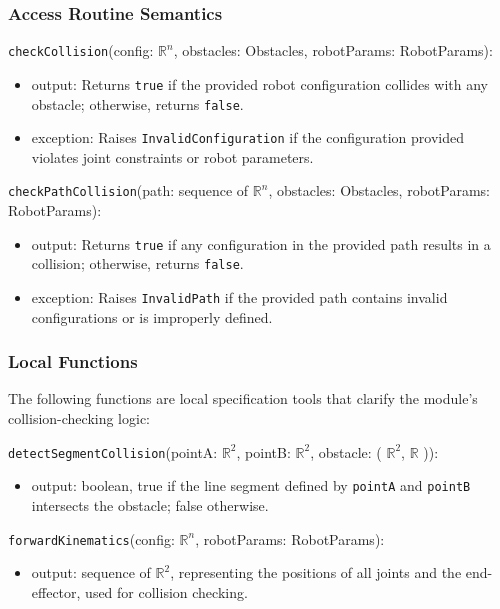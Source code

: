 \documentclass[12pt, titlepage]{article}
\begin{document}
\subsubsection{Access Routine Semantics}

\noindent \texttt{checkCollision}(config: $\mathbb{R}^n$, obstacles: Obstacles, robotParams: RobotParams):
\begin{itemize}
\item output: Returns \texttt{true} if the provided robot configuration collides with any obstacle; otherwise, returns \texttt{false}.
\item exception: Raises \texttt{InvalidConfiguration} if the configuration provided violates joint constraints or robot parameters.
\end{itemize}

\noindent \texttt{checkPathCollision}(path: sequence of $\mathbb{R}^n$, obstacles: Obstacles, robotParams: RobotParams):
\begin{itemize}
\item output: Returns \texttt{true} if any configuration in the provided path results in a collision; otherwise, returns \texttt{false}.
\item exception: Raises \texttt{InvalidPath} if the provided path contains invalid configurations or is improperly defined.
\end{itemize}

\subsubsection{Local Functions}

The following functions are local specification tools that clarify the module's collision-checking logic:

\noindent \texttt{detectSegmentCollision}(pointA: $\mathbb{R}^2$, pointB: $\mathbb{R}^2$, obstacle: ( $\mathbb{R}^2$, $\mathbb{R}$ )):
\begin{itemize}
  \item output: boolean, true if the line segment defined by \texttt{pointA} and \texttt{pointB} intersects the obstacle; false otherwise.
\end{itemize}

\noindent \texttt{forwardKinematics}(config: $\mathbb{R}^n$, robotParams: RobotParams):
\begin{itemize}
  \item output: sequence of $\mathbb{R}^2$, representing the positions of all joints and the end-effector, used for collision checking.
\end{itemize}
\end{document}
